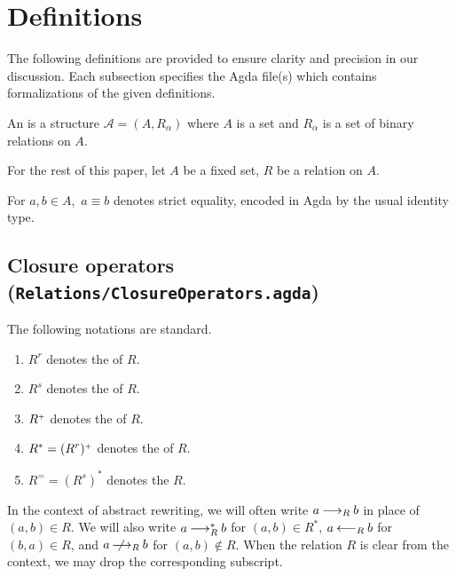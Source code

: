 \section{Definitions}
\label{sec:Definitions}
The following definitions are provided to ensure clarity and precision
in our discussion. Each subsection specifies the Agda file(s) which contains formalizations of the given definitions.

\begin{definition}
    An  is a structure $\mathcal{A} = (A, R_\alpha)$ where
     $A$ is a set and $R_\alpha$ is a set of binary relations on $A$.
\end{definition}

For the rest of this paper, let $A$ be a fixed set, $R$ be a relation on $A$.

For $a,b \in A$,\ $a \equiv b$ denotes strict equality, encoded in Agda by the usual identity type.



\subsection{Closure operators (\texttt{Relations/ClosureOperators.agda})}

\begin{notation}
The following notations are standard.
  \begin{enumerate}
    \item $R^r$ denotes the  of $R$.
    \item $R^s$ denotes the  of $R$.
    \item ${R}^{\scriptscriptstyle{+}}$ denotes the  of $R$.
    \item $R^* = (R^r){}^{\scriptscriptstyle{+}}$ denotes the  of $R$.
    \item $R^= = (R^s)^*$ denotes the  $R$.
  \end{enumerate}
\end{notation}

In the context of abstract rewriting, we will often write $a \mathbin{\longrightarrow_R} b$
in place of $(a,b) \in R$.  We will also write $a \mathbin{\longrightarrow_R^*} b$ for $(a,b) \in R^*$,
$a \mathbin{\longleftarrow_R} b$ for $(b,a) \in R$, and $a \mathbin{\,\,\not \!\!\!\! \mathbin{\longrightarrow_R}} b$ for $(a,b)\notin R$.  When the relation $R$ is clear from the context,
we may drop the corresponding subscript.

